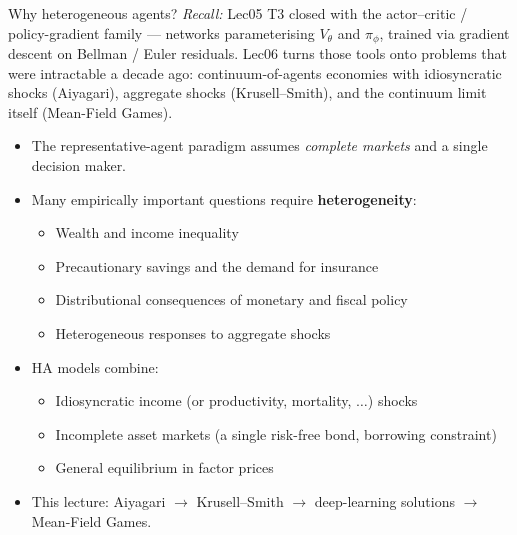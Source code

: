 \begin{frame}{Why heterogeneous agents?}
\textit{Recall:} Lec05 T3 closed with the actor--critic / policy-gradient family --- networks parameterising $V_\theta$ and $\pi_\phi$, trained via gradient descent on Bellman / Euler residuals. Lec06 turns those tools onto problems that were intractable a decade ago: continuum-of-agents economies with idiosyncratic shocks (Aiyagari), aggregate shocks (Krusell--Smith), and the continuum limit itself (Mean-Field Games).
\medskip

\begin{itemize}
\item The representative-agent paradigm assumes \emph{complete markets} and a single decision maker.
\medskip
\item Many empirically important questions require \textbf{heterogeneity}:
  \begin{itemize}
  \item Wealth and income inequality
  \item Precautionary savings and the demand for insurance
  \item Distributional consequences of monetary and fiscal policy
  \item Heterogeneous responses to aggregate shocks
  \end{itemize}
\medskip
\item HA models combine:
  \begin{itemize}
  \item Idiosyncratic income (or productivity, mortality, $\ldots$) shocks
  \item Incomplete asset markets (a single risk-free bond, borrowing constraint)
  \item General equilibrium in factor prices
  \end{itemize}
\medskip
\item This lecture: Aiyagari $\to$ Krusell--Smith $\to$ deep-learning solutions $\to$ Mean-Field Games.
\end{itemize}
\end{frame}

